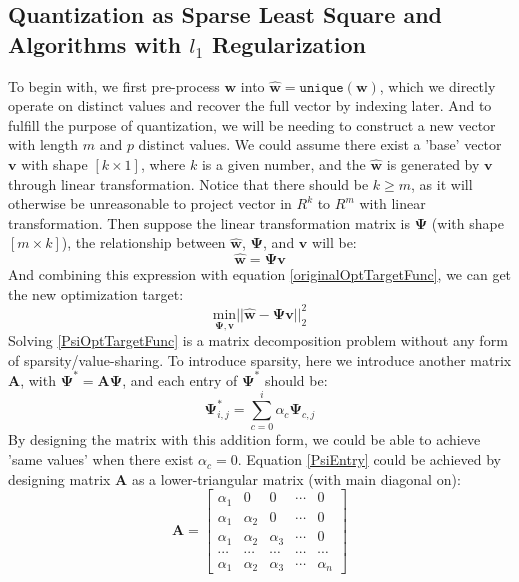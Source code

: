 \documentclass[preprint,10pt]{elsarticle}
\begin{document}
\subsection{Quantization as Sparse Least Square and Algorithms with $l_1$ Regularization}
To begin with, we first pre-process $\boldsymbol{w}$ into $\boldsymbol{\hat{w}}=\texttt{unique}(\boldsymbol{w})$, which we directly operate on distinct values and recover the full vector by indexing later. And to fulfill the purpose of quantization, we will be needing to construct a new vector with length $m$ and $p$ distinct values. We could assume there exist a 'base' vector $\boldsymbol{v}$ with shape $[k \times 1]$, where $k$ is a given number, and the $\boldsymbol{\hat{w}}$ is generated by $\boldsymbol{v}$ through linear transformation. Notice that there should be $k \geq m$, as it will otherwise be unreasonable to project vector in $R^{k}$ to $R^{m}$ with linear transformation. Then suppose the linear transformation matrix is $\boldsymbol{\Psi}$ (with shape $[m \times k]$), the relationship between $\boldsymbol{\hat{w}}$, $\boldsymbol{\Psi}$, and $\boldsymbol{v}$ will be:\\
$$
\boldsymbol{\hat{w}} = \boldsymbol{\Psi}\boldsymbol{v}
$$
And combining this expression with equation \ref{originalOptTargetFunc}, we can get the new optimization target:\\
\begin{equation}
\label{PsiOptTargetFunc}
\underset{\boldsymbol{\Psi},\boldsymbol{v}}{\text{min}}||\boldsymbol{\hat{w}}-\boldsymbol{\Psi}\boldsymbol{v}||_{2}^{2}
\end{equation}
Solving \ref{PsiOptTargetFunc} is a matrix decomposition problem without any form of sparsity/value-sharing. To introduce sparsity, here we introduce another matrix $\boldsymbol{A}$, with $\boldsymbol{\Psi}^{*} = \boldsymbol{A}\boldsymbol{\Psi}$, and each entry of $\boldsymbol{\Psi}^{*} $ should be:\\
\begin{equation}\label{PsiEntry}
\boldsymbol{\Psi}^{*}_{i,j} = \sum_{c=0}^{i}\alpha_c \boldsymbol{\Psi}_{c,j}
\end{equation}
By designing the matrix with this addition form, we could be able to achieve 'same values' when there exist $\alpha_c = 0$. Equation \ref{PsiEntry} could be achieved by designing matrix $\boldsymbol{A}$ as a lower-triangular matrix (with main diagonal on):\\
$$
\boldsymbol{A} = 
\begin{bmatrix}
\alpha_1 & 0 & 0 & \cdots & 0\\
\alpha_1 & \alpha_2 & 0 & \cdots & 0\\
\alpha_1 & \alpha_2 & \alpha_3 & \cdots & 0\\
\cdots & \cdots & \cdots & \cdots & \cdots \\
\alpha_1 & \alpha_2 & \alpha_3 & \cdots &  \alpha_n
\end{bmatrix}
$$
\end{document}
